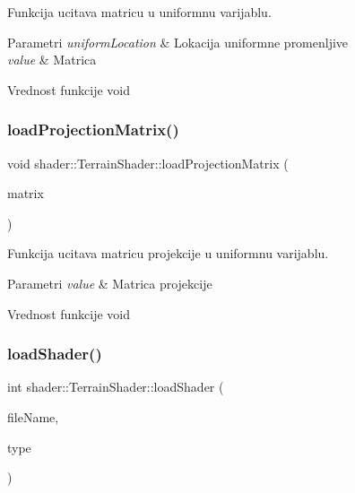 Funkcija ucitava matricu u uniformnu varijablu. 


\begin{DoxyParams}{Parametri}
{\em uniform\+Location} & Lokacija uniformne promenljive \\
\hline
{\em value} & Matrica \\
\hline
\end{DoxyParams}
\begin{DoxyReturn}{Vrednost funkcije}
void 
\end{DoxyReturn}
\mbox{\label{classshader_1_1TerrainShader_a16bbac5b77cac98811441dcd1f212e77}} 
\subsubsection{\texorpdfstring{load\+Projection\+Matrix()}{loadProjectionMatrix()}}
{\footnotesize\ttfamily void shader\+::\+Terrain\+Shader\+::load\+Projection\+Matrix (\begin{DoxyParamCaption}\item[{mat4}]{matrix }\end{DoxyParamCaption})}



Funkcija ucitava matricu projekcije u uniformnu varijablu. 


\begin{DoxyParams}{Parametri}
{\em value} & Matrica projekcije \\
\hline
\end{DoxyParams}
\begin{DoxyReturn}{Vrednost funkcije}
void 
\end{DoxyReturn}
\mbox{\label{classshader_1_1TerrainShader_ada18e1df5cf7306eff49886a35298ef7}} 
\subsubsection{\texorpdfstring{load\+Shader()}{loadShader()}}
{\footnotesize\ttfamily int shader\+::\+Terrain\+Shader\+::load\+Shader (\begin{DoxyParamCaption}\item[{const char $\ast$}]{file\+Name,  }\item[{G\+Lenum}]{type }\end{DoxyParamCaption})\hspace{0.3cm}{\ttfamily [private]}}




